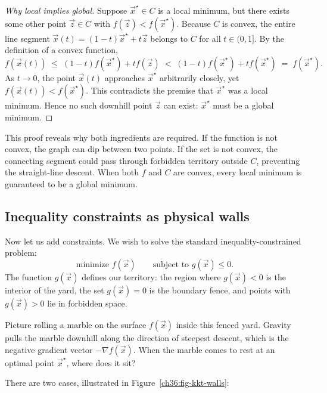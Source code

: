 \begin{proof}[Why local implies global]
Suppose $\vec{x}^\star \in C$ is a local minimum, but there exists some other point $\vec{z} \in C$ with $f(\vec{z}) < f(\vec{x}^\star)$. Because $C$ is convex, the entire line segment $\vec{x}(t) = (1-t)\vec{x}^\star + t\vec{z}$ belongs to $C$ for all $t \in (0, 1]$. By the definition of a convex function,
\[
  f(\vec{x}(t)) \;\le\; (1-t)f(\vec{x}^\star) + t f(\vec{z}) \;<\; (1-t)f(\vec{x}^\star) + t f(\vec{x}^\star) \;=\; f(\vec{x}^\star).
\]
As $t \to 0$, the point $\vec{x}(t)$ approaches $\vec{x}^\star$ arbitrarily closely, yet $f(\vec{x}(t)) < f(\vec{x}^\star)$. This contradicts the premise that $\vec{x}^\star$ was a local minimum. Hence no such downhill point $\vec{z}$ can exist: $\vec{x}^\star$ must be a global minimum.
\end{proof}

This proof reveals why both ingredients are required. If the function is not convex, the graph can dip between two points. If the set is not convex, the connecting segment could pass through forbidden territory outside $C$, preventing the straight-line descent. When both $f$ and $C$ are convex, every local minimum is guaranteed to be a global minimum.

\subsection{Inequality constraints as physical walls}
\label{ch36:physical-walls}

Now let us add constraints. We wish to solve the standard inequality-constrained problem:
\[
  \text{minimize } f(\vec{x}) \qquad \text{subject to } g(\vec{x}) \le 0.
\]
The function $g(\vec{x})$ defines our territory: the region where $g(\vec{x}) < 0$ is the interior of the yard, the set $g(\vec{x}) = 0$ is the boundary fence, and points with $g(\vec{x}) > 0$ lie in forbidden space.

Picture rolling a marble on the surface $f(\vec{x})$ inside this fenced yard. Gravity pulls the marble downhill along the direction of steepest descent, which is the negative gradient vector $-\nabla f(\vec{x})$. When the marble comes to rest at an optimal point $\vec{x}^\star$, where does it sit?

There are two cases, illustrated in Figure~\ref{ch36:fig-kkt-walls}:

